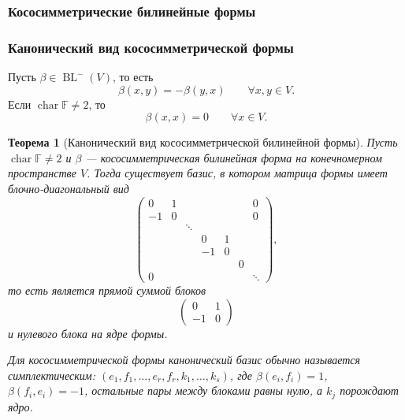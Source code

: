 \documentclass[12pt,a4paper]{article}
\theoremstyle{definition}
\theoremstyle{plain}
\newtheorem{theorem}[definition]{Теорема}
\theoremstyle{remark}
\newenvironment{knowledgefix}{\begin{clarifybox}}{\end{clarifybox}}
\newcommand{\F}{\mathbb{F}}
\newcommand{\BL}{\operatorname{BL}}
\begin{document}
\subsubsection{Кососимметрические билинейные формы}

\subsubsection*{Канонический вид кососимметрической формы}

Пусть $\beta\in\BL^-(V)$, то есть
\[
    \beta(x,y)=-\beta(y,x)
    \qquad \forall x,y\in V.
\]
Если $\operatorname{char}\F\ne2$, то
\[
    \beta(x,x)=0
    \qquad \forall x\in V.
\]

\begin{theorem}[Канонический вид кососимметрической билинейной формы]
Пусть $\operatorname{char}\F\ne2$ и $\beta$ --- кососимметрическая билинейная форма на конечномерном пространстве $V$.
Тогда существует базис, в котором матрица формы имеет блочно-диагональный вид
\[
    \begin{pmatrix}
        0 & 1 &&&&& 0\\
        -1& 0 &&&&& 0\\
        && \ddots &&&& \\
        &&&0&1&&\\
        &&&-1&0&&\\
        &&&&&0&\\
        0&&&&&&\ddots
    \end{pmatrix},
\]
то есть является прямой суммой блоков
\[
    \begin{pmatrix}0&1\\-1&0\end{pmatrix}
\]
и нулевого блока на ядре формы.
\begin{knowledgefix}
Для кососимметрической формы канонический базис обычно называется симплектическим: \((e_1,f_1,\ldots,e_r,f_r,k_1,
\ldots,k_s)\), где \(\beta(e_i,f_i)=1\), \(\beta(f_i,e_i)=-1\), остальные пары между блоками равны нулю, а \(k_j\) порождают ядро.
\end{knowledgefix}
\end{theorem}
\end{document}
